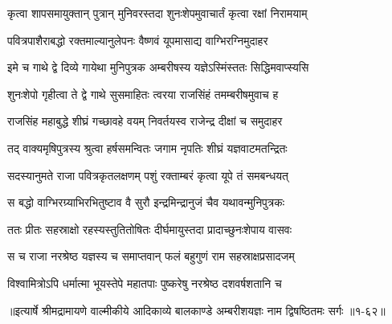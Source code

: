 \twolineshloka
{कृत्वा शापसमायुक्तान् पुत्रान् मुनिवरस्तदा}
{शुनःशेपमुवाचार्तं कृत्वा रक्षां निरामयाम्} %

\twolineshloka
{पवित्रपाशैराबद्धो रक्तमाल्यानुलेपनः}
{वैष्णवं यूपमासाद्य वाग्भिरग्निमुदाहर} %

\twolineshloka
{इमे च गाथे द्वे दिव्ये गायेथा मुनिपुत्रक}
{अम्बरीषस्य यज्ञेऽस्मिंस्ततः सिद्धिमवाप्स्यसि} %

\twolineshloka
{शुनःशेपो गृहीत्वा ते द्वे गाथे सुसमाहितः}
{त्वरया राजसिंहं तमम्बरीषमुवाच ह} %

\twolineshloka
{राजसिंह महाबुद्धे शीघ्रं गच्छावहे वयम्}
{निवर्तयस्व राजेन्द्र दीक्षां च समुदाहर} %

\twolineshloka
{तद् वाक्यमृषिपुत्रस्य श्रुत्वा हर्षसमन्वितः}
{जगाम नृपतिः शीघ्रं यज्ञवाटमतन्द्रितः} %

\twolineshloka
{सदस्यानुमते राजा पवित्रकृतलक्षणम्}
{पशुं रक्ताम्बरं कृत्वा यूपे तं समबन्धयत्} %

\twolineshloka
{स बद्धो वाग्भिरग्र्याभिरभितुष्टाव वै सुरौ}
{इन्द्रमिन्द्रानुजं चैव यथावन्मुनिपुत्रकः} %

\twolineshloka
{ततः प्रीतः सहस्राक्षो रहस्यस्तुतितोषितः}
{दीर्घमायुस्तदा प्रादाच्छुनःशेपाय वासवः} %

\twolineshloka
{स च राजा नरश्रेष्ठ यज्ञस्य च समाप्तवान्}
{फलं बहुगुणं राम सहस्राक्षप्रसादजम्} %

\twolineshloka
{विश्वामित्रोऽपि धर्मात्मा भूयस्तेपे महातपाः}
{पुष्करेषु नरश्रेष्ठ दशवर्षशतानि च} %


॥इत्यार्षे श्रीमद्रामायणे वाल्मीकीये आदिकाव्ये बालकाण्डे अम्बरीशयज्ञः नाम द्विषष्ठितमः सर्गः ॥१-६२॥
